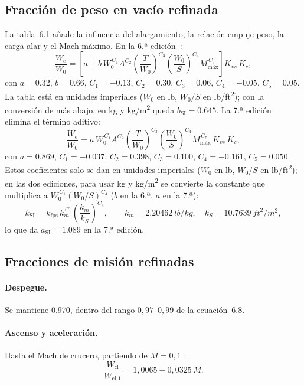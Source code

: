 \documentclass[11pt,a4paper]{article}
\newcommand{\WO}{W_0}
\begin{document}
\subsection{Fracción de peso en vacío refinada}
La tabla~6.1 añade la influencia del alargamiento, la relación empuje-peso,
la carga alar y el Mach máximo. En la 6.ª edición~\cite{raymer6}:
\begin{equation}
  \frac{W_e}{\WO} = \left[a + b\,\WO^{\,C_1} A^{C_2}
    \left(\frac{T}{\WO}\right)^{C_3}\left(\frac{\WO}{S}\right)^{C_4}
    M_\text{máx}^{\,C_5}\right] K_{vs}\,K_c,
\end{equation}
con $a=\num{0.32}$, $b=\num{0.66}$, $C_1=\num{-0.13}$, $C_2=\num{0.30}$,
$C_3=\num{0.06}$, $C_4=\num{-0.05}$, $C_5=\num{0.05}$. La tabla está en
unidades imperiales ($\WO$ en \si{lb}, $\WO/S$ en \si{lb/ft^2}); con la
conversión de más abajo, en \si{kg} y \si{kg/m^2} queda $b_\text{SI} =
\num{0.645}$. La 7.ª edición~\cite{raymer7} elimina el término aditivo:
\begin{equation}
  \frac{W_e}{\WO} = a\,\WO^{\,C_1} A^{C_2}
    \left(\frac{T}{\WO}\right)^{C_3}\left(\frac{\WO}{S}\right)^{C_4}
    M_\text{máx}^{\,C_5}\,K_{vs}\,K_c,
\end{equation}
con $a=\num{0.869}$, $C_1=\num{-0.037}$, $C_2=\num{0.398}$,
$C_3=\num{0.100}$, $C_4=\num{-0.161}$, $C_5=\num{0.050}$. Estos coeficientes
solo se dan en unidades imperiales ($\WO$ en \si{lb}, $\WO/S$ en
\si{lb/ft^2}); en las dos ediciones, para usar \si{kg} y \si{kg/m^2} se
convierte la constante que multiplica a $\WO^{\,C_1}(\WO/S)^{C_4}$ ($b$ en la
6.ª, $a$ en la 7.ª):
\begin{equation}
  k_\text{SI} = k_\text{fps}\,k_m^{\,C_1}\left(\frac{k_m}{k_S}\right)^{C_4},
  \qquad k_m = \SI{2.20462}{lb/kg}, \quad k_S = \SI{10.7639}{ft^2/m^2},
\end{equation}
lo que da $a_\text{SI} = \num{1.089}$ en la 7.ª edición.

\subsection{Fracciones de misión refinadas}

\paragraph{Despegue.} Se mantiene \num{0.970}, dentro del rango
$0{,}97$--$0{,}99$ de la ecuación~6.8.

\paragraph{Ascenso y aceleración.} Hasta el Mach de crucero, partiendo de
$M=0{,}1$ \cite[ec.~6.9]{raymer6}:
\begin{equation}
  \frac{W_\text{cl}}{W_\text{cl-1}} = 1{,}0065 - 0{,}0325\,M .
\end{equation}
\end{document}
